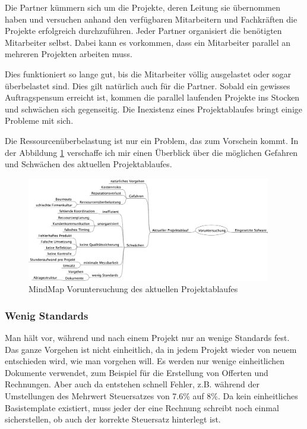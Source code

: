 Die Partner kümmern sich um die Projekte, deren Leitung sie übernommen haben
und versuchen anhand den verfügbaren Mitarbeitern und Fachkräften die Projekte 
erfolgreich durchzuführen. Jeder Partner organisiert die benötigten Mitarbeiter
selbst. Dabei kann es vorkommen, dass ein Mitarbeiter parallel an
mehreren Projekten arbeiten muss.

Dies funktioniert so lange gut, bis die Mitarbeiter völlig ausgelastet oder sogar
überbelastet sind. Dies gilt natürlich auch für die Partner. Sobald ein gewisses 
Auftragspensum erreicht ist, kommen die parallel laufenden Projekte ins Stocken 
und schwächen sich gegenseitig. Die Inexistenz eines Projektablaufes bringt
einige Probleme mit sich.

Die Ressourcenüberbelastung ist nur ein Problem, das zum Vorschein kommt. In der
Abbildung \ref{pic:voruntersuchung_projektablauf} verschaffe ich mir einen 
Überblick über die möglichen Gefahren und Schwächen des aktuellen Projektablaufes.

\begin{figure}[htbp]
\begin{center}
\includegraphics[width=0.95\textwidth,angle=0]{./bilder/analyse/mindmaps/voruntersuchung_projektablauf.pdf}
\caption{MindMap Voruntersuchung des aktuellen Projektablaufes}
\label{pic:voruntersuchung_projektablauf}
\end{center}
\end{figure}

\subsubsection{Wenig Standards}
Man hält vor, während und nach einem Projekt nur an wenige Standards fest. 
Das ganze Vorgehen ist nicht einheitlich, da in jedem Projekt wieder von
neuem entschieden wird, wie man vorgehen will. Es werden nur wenige einheitlichen
Dokumente verwendet, zum Beispiel für die Erstellung von Offerten und Rechnungen.
Aber auch da entstehen schnell Fehler, z.B. während der Umstellungen des 
Mehrwert Steuersatzes von 7.6\% auf 8\%. Da kein einheitliches Basistemplate
existiert, muss jeder der eine Rechnung schreibt noch einmal sicherstellen, ob
auch der korrekte Steuersatz hinterlegt ist. 


